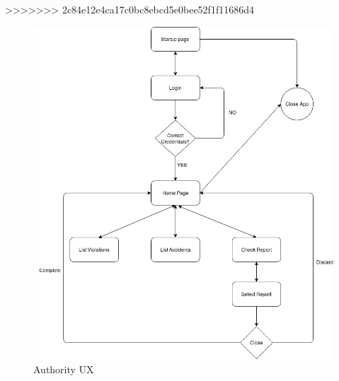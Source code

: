 >>>>>>> 2c84e12e4ca17c0bc8ebcd5e0bee52f1f11686d4
\begin{figure} [H]
	\centering
    \includegraphics[scale=0.5]{Images/authority_ux.jpg}
    \caption{\label{fig:AuthorityUX}Authority UX}
    
\end{figure}
